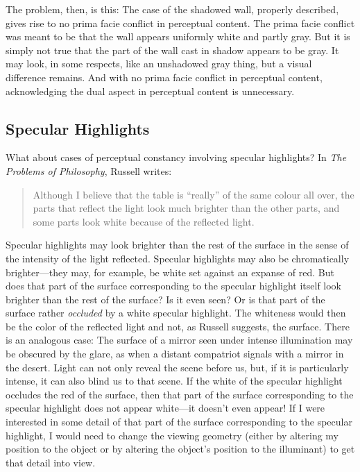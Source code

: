 \documentclass[12pt]{article}
\begin{document}
The problem, then, is this: The case of the shadowed wall, properly described, gives rise to no prima facie conflict in perceptual content. The prima facie conflict was meant to be that the wall appears uniformly white and partly gray. But it is simply not true that the part of the wall cast in shadow appears to be gray. It may look, in some respects, like an unshadowed gray thing, but a visual difference remains. And with no prima facie conflict in perceptual content, acknowledging the dual aspect in perceptual content is unnecessary.


\subsection{Specular Highlights} %
\label{sub:specular_highlights}

What about cases of perceptual constancy involving specular highlights? In \emph{The Problems of Philosophy}, Russell writes:
	\begin{quote}
		Although I believe that the table is ``really'' of the same colour all over, the parts that reflect the light look much brighter than the other parts, and some parts look white because of the reflected light. \citep[2]{Russell:1912uq}
	\end{quote}
Specular highlights may look brighter than the rest of the surface in the sense of the intensity of the light reflected. Specular highlights may also be chromatically brighter---they may, for example, be white set against an expanse of red. But does that part of the surface corresponding to the specular highlight itself look brighter than the rest of the surface? Is it even seen? Or is that part of the surface rather \emph{occluded} by a white specular highlight. The whiteness would then be the color of the reflected light and not, as Russell suggests, the surface. There is an analogous case: The surface of a mirror seen under intense illumination may be obscured by the glare, as when a distant compatriot signals with a mirror in the desert. Light can not only reveal the scene before us, but, if it is particularly intense, it can also blind us to that scene. If the white of the specular highlight occludes the red of the surface, then that part of the surface corresponding to the specular highlight does not appear white---it doesn't even appear! If I were interested in some detail of that part of the surface corresponding to the specular highlight, I would need to change the viewing geometry (either by altering my position to the object or by altering the object's position to the illuminant) to get that detail into view.
\end{document}
